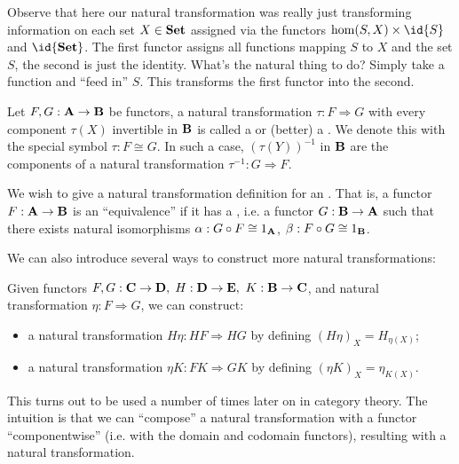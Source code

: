 \begin{rmk}
Observe that here our natural transformation was really just
transforming information on each set $X\in\mathbf{Set}$ assigned via
the functors $\hom(S,X)\times\id{S}$ and $\id{\ms{Set}}$. The
first functor assigns all functions mapping $S$ to $X$ and the
set $S$, the second is just the identity. What's the natural
thing to do? Simply take a function and ``feed in'' $S$. This
transforms the first functor into the second.
\end{rmk}

\begin{defn}%
Let $F,G:\mathbf{A}\to\mathbf{B}$ be functors, a natural transformation
$\tau:F\Rightarrow G$ with every component $\tau(X)$ invertible
in $\mathbf{B}$ is called a  or (better)
a . We denote this with the special
symbol $\tau: F\cong G$. In such a case, $(\tau(Y))^{-1}$ in
$\mathbf{B}$ are the components of a natural transformation
$\tau^{-1}:G\Rightarrow F$.
\end{defn}

\begin{defn}%
We wish to give a natural transformation definition for an
. That is, a functor $F:\mathbf{A}\to\mathbf{B}$ is
an ``equivalence'' if it has a , 
i.e. a functor $G:\mathbf{B}\to\mathbf{A}$ such that there exists natural
isomorphisms $\alpha:G\circ F\cong 1_\mathbf{A}$, $\beta:F\circ G\cong 1_\mathbf{B}$.
\end{defn}

We can also introduce several ways to construct more natural
transformations:
\begin{prop}\label{prop:composeFunctorsAndNaturalTransformations}
Given functors $F,G:\mathbf{C}\to\mathbf{D},$ $H:\mathbf{D}\to\mathbf{E},$
$K:\mathbf{B}\to\mathbf{C}$, and natural transformation
$\eta:F\Rightarrow G$, we can construct:
\begin{itemize}
\item a natural transformation $H\eta:HF\Rightarrow{}HG$ by
  defining $(H\eta)_{X}=H_{\eta(X)}$;
\item a natural transformation $\eta K:FK\Rightarrow{}GK$ by
  defining $(\eta K)_{X}=\eta_{K(X)}$.
\end{itemize} 
\end{prop}
This turns out to be used a number of times later on in category
theory. The intuition is that we can ``compose'' a natural
transformation with a functor ``componentwise'' (i.e. with the
domain and codomain functors), resulting with a natural transformation.

